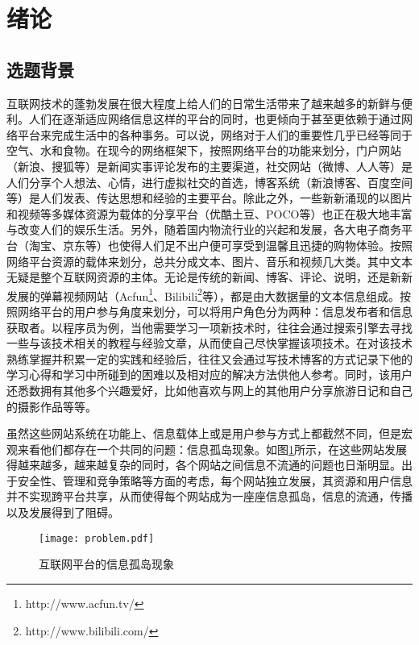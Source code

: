 \section{绪论}

\subsection{选题背景}
互联网技术的蓬勃发展在很大程度上给人们的日常生活带来了越来越多的新鲜与便利。人们在逐渐适应网络信息这样的平台的同时，也更倾向于甚至更依赖于通过网络平台来完成生活中的各种事务。可以说，网络对于人们的重要性几乎已经等同于空气、水和食物。在现今的网络框架下，按照网络平台的功能来划分，门户网站（新浪、搜狐等）是新闻实事评论发布的主要渠道，社交网站（微博、人人等）是人们分享个人想法、心情，进行虚拟社交的首选，博客系统（新浪博客、百度空间等）是人们发表、传达思想和经验的主要平台。除此之外，一些新新涌现的以图片和视频等多媒体资源为载体的分享平台（优酷土豆、POCO等）也正在极大地丰富与改变人们的娱乐生活。另外，随着国内物流行业的兴起和发展，各大电子商务平台（淘宝、京东等）也使得人们足不出户便可享受到温馨且迅捷的购物体验。按照网络平台资源的载体来划分，总共分成文本、图片、音乐和视频几大类。其中文本无疑是整个互联网资源的主体。无论是传统的新闻、博客、评论、说明，还是新新发展的弹幕视频网站（Acfun\footnote{http://www.acfun.tv/}、Bilibili\footnote{http://www.bilibili.com/}等），都是由大数据量的文本信息组成。按照网络平台的用户参与角度来划分，可以将用户角色分为两种：信息发布者和信息获取者。以程序员为例，当他需要学习一项新技术时，往往会通过搜索引擎去寻找一些与该技术相关的教程与经验文章，从而使自己尽快掌握该项技术。在对该技术熟练掌握并积累一定的实践和经验后，往往又会通过写技术博客的方式记录下他的学习心得和学习中所碰到的困难以及相对应的解决方法供他人参考。同时，该用户还悉数拥有其他多个兴趣爱好，比如他喜欢与网上的其他用户分享旅游日记和自己的摄影作品等等。

虽然这些网站系统在功能上、信息载体上或是用户参与方式上都截然不同，但是宏观来看他们都存在一个共同的问题：信息孤岛现象。如图\ref{fig:problem}所示，在这些网站发展得越来越多，越来越复杂的同时，各个网站之间信息不流通的问题也日渐明显。出于安全性、管理和竞争策略等方面的考虑，每个网站独立发展，其资源和用户信息并不实现跨平台共享，从而使得每个网站成为一座座信息孤岛，信息的流通，传播以及发展得到了阻碍。

\begin{figure}
\centering
\texttt{[image: problem.pdf]}
\caption{互联网平台的信息孤岛现象}
\label{fig:problem}
\end{figure}

